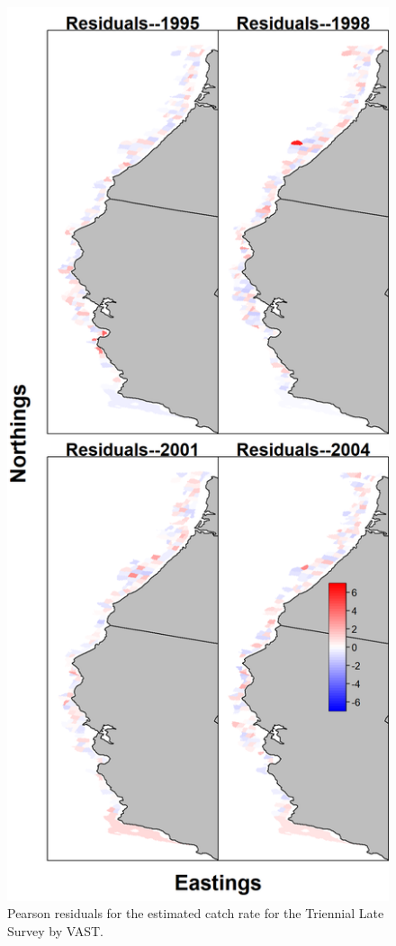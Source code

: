 \documentclass[12pt,]{article}
\begin{document}
\FloatBarrier

\begin{figure}
\centering
\includegraphics{Figures/tri_late_maps--catchrate_pearson_resid.png}
\caption{Pearson residuals for the estimated catch rate for the
Triennial Late Survey by VAST. \label{fig:tri_late_catch_rate}}
\end{figure}
\end{document}
